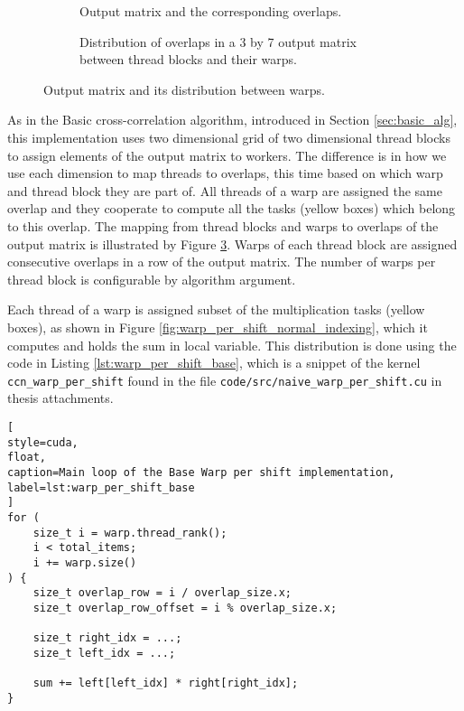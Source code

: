 \begin{figure}[ht]
	\centering	
	\begin{subfigure}{0.55\textwidth}
		\fontsize{6}{8}\selectfont
		\centering
		\def\svgwidth{\textwidth}
		
		\caption{Output matrix and the corresponding overlaps.}
		\label{fig:warp_per_shift_overlaps}
	\end{subfigure}
	\hfill
	\begin{subfigure}{0.4\textwidth}
		\centering
		\def\svgwidth{\textwidth}
		\fontsize{6}{8}\selectfont
		
		\caption{Distribution of overlaps in a 3 by 7 output matrix between thread blocks and their warps.}
		\label{fig:warp_per_shift_warps}
	\end{subfigure}
	
	\caption{Output matrix and its distribution between warps.}
\end{figure}

As in the Basic cross-correlation algorithm, introduced in Section \ref{sec:basic_alg}, this implementation uses two dimensional grid of two dimensional thread blocks to assign elements of the output matrix to workers. The difference is in how we use each dimension to map threads to overlaps, this time based on which warp and thread block they are part of. All threads of a warp are assigned the same overlap and they cooperate to compute all the tasks (yellow boxes) which belong to this overlap. The mapping from thread blocks and warps to overlaps of the output matrix is illustrated by Figure \ref{fig:warp_per_shift_warps}. Warps of each thread block are assigned consecutive overlaps in a row of the output matrix. The number of warps per thread block is configurable by algorithm argument.

Each thread of a warp is assigned subset of the multiplication tasks (yellow boxes), as shown in Figure \ref{fig:warp_per_shift_normal_indexing}, which it computes and holds the sum in local variable. This distribution is done using the code in Listing \ref{lst:warp_per_shift_base}, which is a snippet of the kernel \texttt{ccn\_warp\_per\_shift} found in the file \texttt{code/src/naive\_warp\_per\_shift.cu} in thesis attachments.

\begin{lstlisting}[
style=cuda,
float,
caption=Main loop of the Base Warp per shift implementation,
label=lst:warp_per_shift_base
]
for (
	size_t i = warp.thread_rank(); 
	i < total_items; 
	i += warp.size()
) {
	size_t overlap_row = i / overlap_size.x;
	size_t overlap_row_offset = i % overlap_size.x;

	size_t right_idx = ...;
	size_t left_idx = ...;

	sum += left[left_idx] * right[right_idx];
}
\end{lstlisting}

